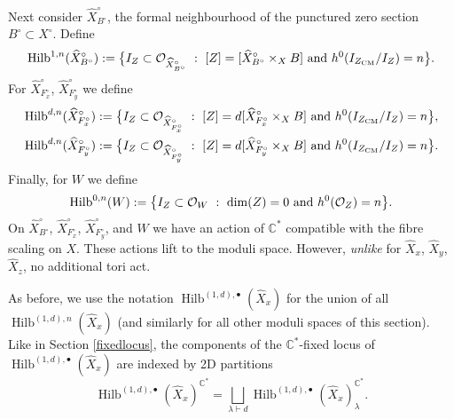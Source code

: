\documentclass{amsart}
\theoremstyle{definition}
\newcommand{\CC} {\mathbb{C}}          %
\renewcommand{\O}{\mathcal{O}}
\newcommand{\Hilb}{\operatorname{Hilb}}
\newcommand{\CM}{\operatorname{CM}}
\begin{document}
Next consider $\widehat{X}^{\circ}_{B^\circ}$, the formal neighbourhood of the punctured zero section $B^\circ \subset X^\circ$. Define
$$
\Hilb^{1,n}(\widehat{X}^{\circ}_{B^\circ}) := \big\{ I_Z \subset \O_{\widehat{X}^{\circ}_{B^\circ}} \ : \ [Z] = [\widehat{X}^{\circ}_{B^\circ} \times_X B] \ {\rm{and}} \ h^0(I_{Z_{\CM}} / I_Z) = n \big\}.
$$
For $\widehat{X}^{\circ}_{F_{x}^{\circ}}$, $\widehat{X}^{\circ}_{F_{y}^{\circ}}$ we define
\begin{align*}
\Hilb^{d,n}(\widehat{X}^{\circ}_{F_{x}^{\circ}}) &:= \big\{ I_Z \subset \O_{\widehat{X}^{\circ}_{F_{x}^{\circ}}} \ : \ [Z] = d [\widehat{X}^{\circ}_{F_{x}^{\circ}} \times_X B] \ {\rm{and}} \ h^0(I_{Z_{\CM}} / I_Z) = n \big\}, \\
\Hilb^{d,n}(\widehat{X}^{\circ}_{F_{y}^{\circ}}) &:= \big\{ I_Z \subset \O_{\widehat{X}^{\circ}_{F_{y}^{\circ}}} \ : \ [Z] = d [\widehat{X}^{\circ}_{F_{y}^{\circ}} \times_X B] \ {\rm{and}} \ h^0(I_{Z_{\CM}} / I_Z) = n \big\}.
\end{align*}
Finally, for $W$ we define
$$
\Hilb^{0,n}(W) := \big\{ I_Z \subset \O_{W} \ : \ \dim(Z) = 0 \ {\rm{and}} \ h^0(\O_Z) = n \big\}.
$$
On $\widehat{X}^{\circ}_{B^\circ}$, $\widehat{X}^{\circ}_{F_{x}^{\circ}}$, $\widehat{X}^{\circ}_{F_{y}^{\circ}}$, and $W$ we have an action of $\CC^*$ compatible with the fibre scaling on $X$. These actions lift to the moduli space. However, \emph{unlike} for $\widehat{X}_x$, $\widehat{X}_y$, $\widehat{X}_z$, no additional tori act.

As before, we use the notation $\Hilb^{(1,d),\bullet}(\widehat{X}_x)$ for the union of all $\Hilb^{(1,d),n}(\widehat{X}_x)$ (and similarly for all other moduli spaces of this section). Like in Section \ref{fixedlocus}, the components of the $\CC^*$-fixed locus of $\Hilb^{(1,d),\bullet}(\widehat{X}_x)$ are indexed by 2D partitions 
$$
\Hilb^{(1,d),\bullet}(\widehat{X}_x)^{\CC^*} = \bigsqcup_{\lambda \vdash d} \Hilb^{(1,d),\bullet}(\widehat{X}_x)_{\lambda}^{\CC^*}.
$$
\end{document}
